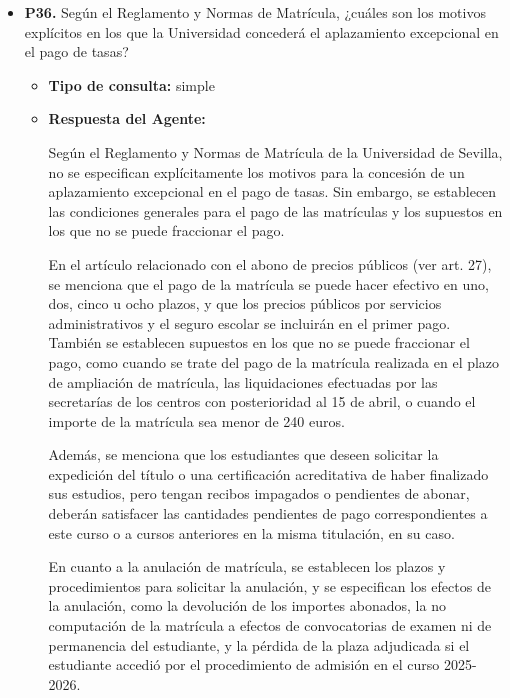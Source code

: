 \documentclass{article}
\begin{document}
\begin{itemize}
\begin{itemize}
            \end{itemize}

      \item \textbf{P36.} Según el Reglamento y Normas de Matrícula, ¿cuáles son los motivos explícitos en los que la Universidad concederá el aplazamiento excepcional en el pago de tasas? \\
            \begin{itemize}
                  \item \textbf{Tipo de consulta:} simple
                  \item \textbf{Respuesta del Agente:}

                        Según el Reglamento y Normas de Matrícula de la Universidad de Sevilla, no se especifican explícitamente los motivos para la concesión de un aplazamiento excepcional en el pago de tasas. Sin embargo, se establecen las condiciones generales para el pago de las matrículas y los supuestos en los que no se puede fraccionar el pago.

                        En el artículo relacionado con el abono de precios públicos (ver art. 27), se menciona que el pago de la matrícula se puede hacer efectivo en uno, dos, cinco u ocho plazos, y que los precios públicos por servicios administrativos y el seguro escolar se incluirán en el primer pago. También se establecen supuestos en los que no se puede fraccionar el pago, como cuando se trate del pago de la matrícula realizada en el plazo de ampliación de matrícula, las liquidaciones efectuadas por las secretarías de los centros con posterioridad al 15 de abril, o cuando el importe de la matrícula sea menor de 240 euros.

                        Además, se menciona que los estudiantes que deseen solicitar la expedición del título o una certificación acreditativa de haber finalizado sus estudios, pero tengan recibos impagados o pendientes de abonar, deberán satisfacer las cantidades pendientes de pago correspondientes a este curso o a cursos anteriores en la misma titulación, en su caso.

                        En cuanto a la anulación de matrícula, se establecen los plazos y procedimientos para solicitar la anulación, y se especifican los efectos de la anulación, como la devolución de los importes abonados, la no computación de la matrícula a efectos de convocatorias de examen ni de permanencia del estudiante, y la pérdida de la plaza adjudicada si el estudiante accedió por el procedimiento de admisión en el curso 2025-2026.


\end{itemize}
\end{itemize}
\end{document}
